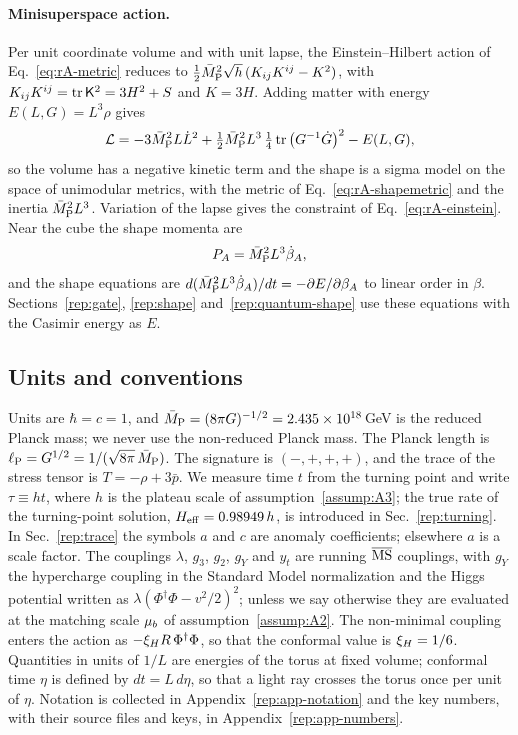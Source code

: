 \paragraph{Minisuperspace action.}
Per unit coordinate volume and with unit lapse, the Einstein--Hilbert action of Eq.~\eqref{eq:rA-metric} reduces to $\tfrac12\bar M_{\mathrm{P}}^2\sqrt h\,(K_{ij}K^{ij}-K^2)$, with $K_{ij}K^{ij}=\operatorname{tr}\mathsf K^2=3H^2+S$ and $K=3H$.
Adding matter with energy $E(L,G)=L^3\rho$ gives
\begin{equation}
\mathcal L=-3\bar M_{\mathrm{P}}^2L\dot L^2+\tfrac12\bar M_{\mathrm{P}}^2L^3\,\tfrac14\operatorname{tr}\big(G^{-1}\dot G\big)^2-E(L,G),
\label{eq:rA-minisuperspace}
\end{equation}
so the volume has a negative kinetic term and the shape is a sigma model on the space of unimodular metrics, with the metric of Eq.~\eqref{eq:rA-shapemetric} and the inertia $\bar M_{\mathrm{P}}^2L^3$.
Variation of the lapse gives the constraint of Eq.~\eqref{eq:rA-einstein}.
Near the cube the shape momenta are
\begin{equation}
P_A=\bar M_{\mathrm{P}}^2L^3\dot\beta_A ,
\label{eq:rA-PA}
\end{equation}
and the shape equations are $d(\bar M_{\mathrm{P}}^2L^3\dot\beta_A)/dt=-\partial E/\partial\beta_A$ to linear order in $\beta$.
Sections~\ref{rep:gate}, \ref{rep:shape} and~\ref{rep:quantum-shape} use these equations with the Casimir energy as $E$.

\subsection{Units and conventions}
\label{rA:units}

Units are $\hbar=c=1$, and $\bar M_{\mathrm{P}}=(8\pi G)^{-1/2}=2.435\times10^{18}$\,GeV is the reduced Planck mass; we never use the non-reduced Planck mass. %
The Planck length is $\ell_{\rm P}=G^{1/2}=1/(\sqrt{8\pi}\,\bar M_{\mathrm{P}})$.
The signature is $(-,+,+,+)$, and the trace of the stress tensor is $T=-\rho+3\bar p$.
We measure time $t$ from the turning point and write $\tau\equiv ht$, where $h$ is the plateau scale of assumption~\ref{assump:A3}; the true rate of the turning-point solution, $H_{\mathrm{eff}}=0.98949\,h$, is introduced in Sec.~\ref{rep:turning}. %
In Sec.~\ref{rep:trace} the symbols $a$ and $c$ are anomaly coefficients; elsewhere $a$ is a scale factor.
The couplings $\lambda$, $g_3$, $g_2$, $g_Y$ and $y_t$ are running $\overline{\mathrm{MS}}$ couplings, with $g_Y$ the hypercharge coupling in the Standard Model normalization and the Higgs potential written as $\lambda(\Phi^\dagger\Phi-v^2/2)^2$; unless we say otherwise they are evaluated at the matching scale $\mu_b$ of assumption~\ref{assump:A2}.
The non-minimal coupling enters the action as $-\xi_H R\,\Phi^\dagger\Phi$, so that the conformal value is $\xi_H=1/6$.
Quantities in units of $1/L$ are energies of the torus at fixed volume; conformal time $\eta$ is defined by $dt=L\,d\eta$, so that a light ray crosses the torus once per unit of $\eta$.
Notation is collected in Appendix~\ref{rep:app-notation} and the key numbers, with their source files and keys, in Appendix~\ref{rep:app-numbers}.

